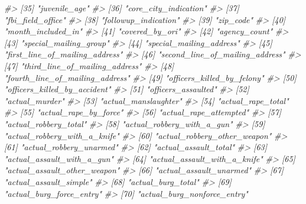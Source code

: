 \documentclass[
]{krantz}
\makeatletter
\newenvironment{Shaded}{\begin{snugshade}}{\end{snugshade}}
\newcommand{\CommentTok}[1]{\textcolor[rgb]{0.37,0.37,0.37}{\textit{#1}}}
\newenvironment{kframe}{%
\medskip{}
\setlength{\fboxsep}{.8em}
 \def\at@end@of@kframe{}%
 \ifinner\ifhmode%
  \def\at@end@of@kframe{\end{minipage}}%
  \begin{minipage}{\columnwidth}%
 \fi\fi%
 \def\FrameCommand##1{\hskip\@totalleftmargin \hskip-\fboxsep
 \colorbox{shadecolor}{##1}\hskip-\fboxsep
     \hskip-\linewidth \hskip-\@totalleftmargin \hskip\columnwidth}%
 \MakeFramed {\advance\hsize-\width
   \@totalleftmargin\z@ \linewidth\hsize
   \@setminipage}}%
 {\par\unskip\endMakeFramed%
 \at@end@of@kframe}
\renewenvironment{Shaded}{\begin{kframe}}{\end{kframe}}
\makeatother
\begin{document}
\begin{Shaded}
\begin{Highlighting}[]
\CommentTok{\#\textgreater{}  [35] "juvenile\_age"                    }
\CommentTok{\#\textgreater{}  [36] "core\_city\_indication"            }
\CommentTok{\#\textgreater{}  [37] "fbi\_field\_office"                }
\CommentTok{\#\textgreater{}  [38] "followup\_indication"             }
\CommentTok{\#\textgreater{}  [39] "zip\_code"                        }
\CommentTok{\#\textgreater{}  [40] "month\_included\_in"               }
\CommentTok{\#\textgreater{}  [41] "covered\_by\_ori"                  }
\CommentTok{\#\textgreater{}  [42] "agency\_count"                    }
\CommentTok{\#\textgreater{}  [43] "special\_mailing\_group"           }
\CommentTok{\#\textgreater{}  [44] "special\_mailing\_address"         }
\CommentTok{\#\textgreater{}  [45] "first\_line\_of\_mailing\_address"   }
\CommentTok{\#\textgreater{}  [46] "second\_line\_of\_mailing\_address"  }
\CommentTok{\#\textgreater{}  [47] "third\_line\_of\_mailing\_address"   }
\CommentTok{\#\textgreater{}  [48] "fourth\_line\_of\_mailing\_address"  }
\CommentTok{\#\textgreater{}  [49] "officers\_killed\_by\_felony"       }
\CommentTok{\#\textgreater{}  [50] "officers\_killed\_by\_accident"     }
\CommentTok{\#\textgreater{}  [51] "officers\_assaulted"              }
\CommentTok{\#\textgreater{}  [52] "actual\_murder"                   }
\CommentTok{\#\textgreater{}  [53] "actual\_manslaughter"             }
\CommentTok{\#\textgreater{}  [54] "actual\_rape\_total"               }
\CommentTok{\#\textgreater{}  [55] "actual\_rape\_by\_force"            }
\CommentTok{\#\textgreater{}  [56] "actual\_rape\_attempted"           }
\CommentTok{\#\textgreater{}  [57] "actual\_robbery\_total"            }
\CommentTok{\#\textgreater{}  [58] "actual\_robbery\_with\_a\_gun"       }
\CommentTok{\#\textgreater{}  [59] "actual\_robbery\_with\_a\_knife"     }
\CommentTok{\#\textgreater{}  [60] "actual\_robbery\_other\_weapon"     }
\CommentTok{\#\textgreater{}  [61] "actual\_robbery\_unarmed"          }
\CommentTok{\#\textgreater{}  [62] "actual\_assault\_total"            }
\CommentTok{\#\textgreater{}  [63] "actual\_assault\_with\_a\_gun"       }
\CommentTok{\#\textgreater{}  [64] "actual\_assault\_with\_a\_knife"     }
\CommentTok{\#\textgreater{}  [65] "actual\_assault\_other\_weapon"     }
\CommentTok{\#\textgreater{}  [66] "actual\_assault\_unarmed"          }
\CommentTok{\#\textgreater{}  [67] "actual\_assault\_simple"           }
\CommentTok{\#\textgreater{}  [68] "actual\_burg\_total"               }
\CommentTok{\#\textgreater{}  [69] "actual\_burg\_force\_entry"         }
\CommentTok{\#\textgreater{}  [70] "actual\_burg\_nonforce\_entry"      }

\end{Highlighting}
\end{Shaded}
\end{document}

